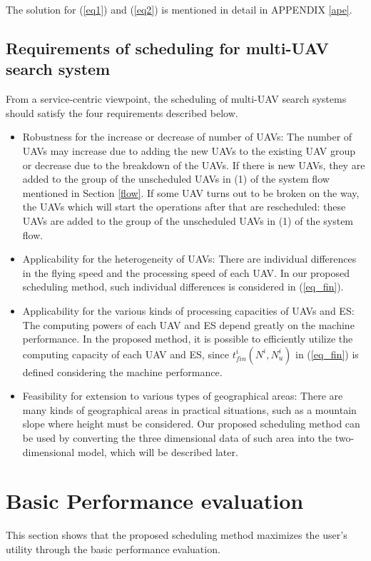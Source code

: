\documentclass{ieeeaccess}
\begin{document}
The solution for (\ref{eq1}) and (\ref{eq2}) is mentioned in detail in APPENDIX \ref{ape}.

\subsection{Requirements of scheduling for multi-UAV search system} \label{feature}
From a service-centric viewpoint, the scheduling of multi-UAV search systems should satisfy the four requirements described below.
\begin{itemize}
\item Robustness for the increase or decrease of number of UAVs: 
The number of UAVs may increase due to adding the new UAVs to the existing UAV group or decrease due to the breakdown of the UAVs. 
If there is new UAVs, they are added to the group of the unscheduled UAVs in (1) of the system flow mentioned in Section \ref{flow}.
If some UAV turns out to be broken on the way, the UAVs which will start the operations after that are rescheduled: these UAVs   are added to the group of the unscheduled UAVs in (1) of the system flow.
%
\item Applicability for the heterogeneity of UAVs: 
There are individual differences in the flying speed and the processing speed of each UAV. 
In our proposed scheduling method, such individual differences is considered in (\ref{eq_fin}).
%
\item Applicability for the various kinds of processing capacities of UAVs and ES: 
The computing powers of each UAV and ES depend greatly on the machine performance. In the proposed method, it is possible to efficiently utilize the computing capacity of each UAV and ES, since $t_{fin}^i(N^i,N_u^i)$ in (\ref{eq_fin}) is defined considering the machine performance.
%
\item Feasibility for extension to various types of geographical areas: 
There are many kinds of geographical areas in practical situations, such as a mountain slope where height must be considered.
Our proposed scheduling method can be used by converting the three dimensional data of such area into the two-dimensional model, which will be described later.
\end{itemize}

\section{Basic Performance evaluation}\label{eva}
This section shows that the proposed scheduling method maximizes the user's utility through the basic performance evaluation.
\end{document}
